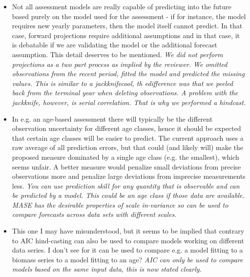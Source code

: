 \begin{itemize}
\begin{itemize}
    \item Not all assessment models are really capable of predicting into the future based purely on the model used for the assessment - if for instance, the model requires new yearly parameters, then the model itself cannot predict. In that case, forward projections require additional assumptions and in that case, it is debatable if we are validating the model or the additional forecast assumption. This detail deserves to be mentioned.
    \textit{\newline We did not perform projections as a two part process as implied by the reviewer. We omitted observations from the recent period, fitted the model and predicted the missing values.  This is similar to a jackknifecool, th edifference was that we peeled back from the terminal year when deleting observations. A problem with the jackknife, however,  is serial correlation. That is why we  performed a hindcast. %
    }

    \item In e.g. an age-based assessment there will typically be the different observation uncertainty for different age classes, hence it should be expected that certain age classes will be easier to predict. The current approach uses a raw average of all prediction errors, but that could (and likely will) make the proposed measure dominated by a single age class (e.g. the smallest), which seems unfair. A better measure would penalize small deviations from precise observations more and penalize large deviations from imprecise measurements less.
    \textit{\newline You can use prediction skill for any quantity that is observable and can be predicted by a model. This could be an age class if those data are available. MASE has the desirable properties of scale in-variance so can be used to compare forecasts across data sets with different scales.}

    \item This one I may have misunderstood, but it seems to be implied that contrary to AIC hind-casting can also be used to compare models working on different data series. I don't see for it can be used to compare e.g. a model fitting to a biomass series to a model fitting to an age?
    \textit{\newline AIC can only be used to compare models based on the same input data, this is now stated clearly. }


\end{itemize}
\end{itemize}
